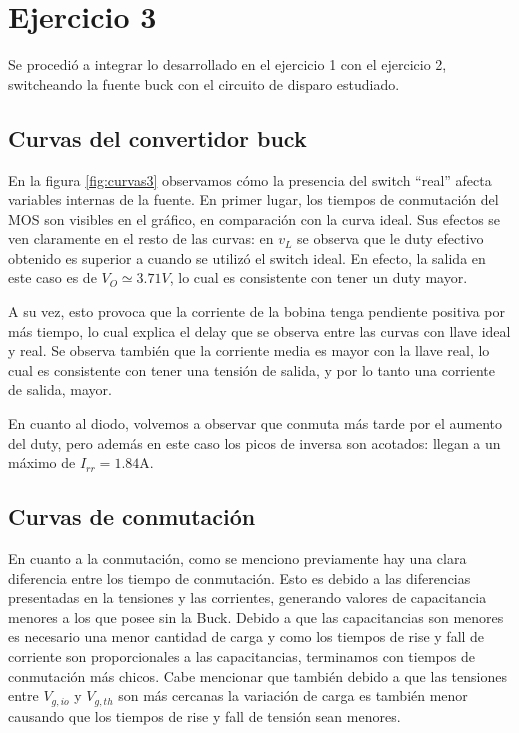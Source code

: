 \documentclass[e4_tp1_main.tex]{subfiles}
\begin{document}
\section{Ejercicio 3}

Se procedi\'o a integrar lo desarrollado en el ejercicio 1 con el ejercicio 2, switcheando la fuente buck con el circuito de disparo estudiado. 

\subsection{Curvas del convertidor buck}

En la figura \ref{fig:curvas3} observamos c\'omo la presencia del switch ``real'' afecta variables internas de la fuente. En primer lugar, los tiempos de conmutaci\'on del MOS son visibles en el gr\'afico, en comparaci\'on con la curva ideal. Sus efectos se ven claramente en el resto de las curvas: en $v_L$ se observa que le duty efectivo obtenido es superior a cuando se utiliz\'o el switch ideal. En efecto, la salida en este caso es de $V_O\simeq3.71V$, lo cual es consistente con tener un duty mayor.

A su vez, esto provoca que la corriente de la bobina tenga pendiente positiva por m\'as tiempo, lo cual explica el delay que se observa entre las curvas con llave ideal y real. Se observa tambi\'en que la corriente media es mayor con la llave real, lo cual es consistente con tener una tensi\'on de salida, y por lo tanto una corriente de salida, mayor.

En cuanto al diodo, volvemos a observar que conmuta m\'as tarde por el aumento del duty, pero adem\'as en este caso los picos de inversa son acotados: llegan a un m\'aximo de $I_{rr}=1.84$A.


\subsection{Curvas de conmutaci\'on}

En cuanto a la conmutación, como se menciono previamente hay una clara diferencia entre los tiempo de conmutación. Esto es debido a las diferencias presentadas en la tensiones y las corrientes, generando valores de capacitancia menores a los que posee sin la Buck. Debido a que las capacitancias son menores es necesario una menor cantidad de carga y como los tiempos de rise y fall de corriente son proporcionales a las capacitancias, terminamos con tiempos de conmutación más chicos. Cabe mencionar que también debido a que las  tensiones entre $V_{g,io}$ y $V_{g,th}$ son más cercanas la variación de carga es también menor causando que los tiempos de rise y fall de tensión sean menores. 
\end{document}
